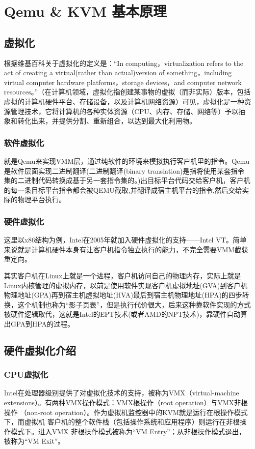 \section{Qemu \& KVM 基本原理}
\subsection{虚拟化}
根据维基百科关于虚拟化的定义是：“In computing，virtualization refers to the act of creating a virtual(rather than actual)version of something，including virtual computer hardware platforms，storage devices，and computer network resources。”（在计算机领域，虚拟化指创建某事物的虚拟（而非实际）版本，包括虚拟的计算机硬件平台、存储设备，以及计算机网络资源）可见，虚拟化是一种资源管理技术，它将计算机的各种实体资源（CPU、内存、存储、网络等）予以抽象和转化出来，并提供分割、重新组合，以达到最大化利用物。

\subsubsection{软件虚拟化}
就是Qemu来实现VMM层，通过纯软件的环境来模拟执行客户机里的指令。Qemu是软件层面实现二进制翻译(二进制翻译(binary translation)是指将使用某套指令集的二进制代码转换成基于另一套指令集的。)出目标平台代码交给客户机，客户机的每一条目标平台指令都会被QEMU截取,并翻译成宿主机平台的指令,然后交给实际的物理平台执行。

\subsubsection{硬件虚拟化}
这里以x86结构为例，Intel在2005年就加入硬件虚拟化的支持——Intel VT。简单来说就是计算机硬件本身有让客户机指令独立执行的能力，不完全需要VMM截获重定向。

其实客户机在Linux上就是一个进程，客户机访问自己的物理内存，实际上就是Linux内核管理的虚拟内存，以前是使用软件实现客户机虚拟地址(GVA)到客户机物理地址(GPA)再到宿主机虚拟地址(HVA)最后到宿主机物理地址(HPA)的四步转换，这个机制也称为“影子页表”，但是执行代价很大，后来这种靠软件实现的方式被硬件逻辑取代，这就是Intel的EPT技术(或者AMD的NPT技术)，靠硬件自动算出GPA到HPA的过程。

\subsection{硬件虚拟化介绍}

\subsubsection{CPU虚拟化}
Intel在处理器级别提供了对虚拟化技术的支持，被称为VMX（virtual-machine
extensions）。有两种VMX操作模式：VMX根操作（root operation）与VMX非根操作
（non-root operation）。作为虚拟机监控器中的KVM就是运行在根操作模式下，而虚拟机
客户机的整个软件栈（包括操作系统和应用程序）则运行在非根操作模式下。进入VMX
非根操作模式被称为“VM Entry”；从非根操作模式退出，被称为“VM Exit”。

